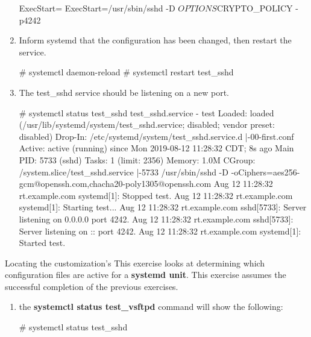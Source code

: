 \begin{Lab}
\begin{exe}
\begin{enumerate}
\begin{raw}
[Service]
ExecStart=
ExecStart=/usr/sbin/sshd -D $OPTIONS $CRYPTO_POLICY -p4242
		\end{raw}

		\item 
		Inform systemd that the configuration has been changed, then restart the service.
		\begin{raw}
# systemctl daemon-reload 
# systemctl restart test_sshd 
		\end{raw} 

		\item 
		The test\_sshd service should be listening on a new port. 
		\begin{rawfootnotesize} 
# systemctl status   test_sshd
 test_sshd.service - test
   Loaded: loaded (/usr/lib/systemd/system/test_sshd.service; disabled; vendor preset: disabled)
  Drop-In: /etc/systemd/system/test_sshd.service.d
           |-00-first.conf
   Active: active (running) since Mon 2019-08-12 11:28:32 CDT; 8s ago
 Main PID: 5733 (sshd)
    Tasks: 1 (limit: 2356)
   Memory: 1.0M
   CGroup: /system.slice/test_sshd.service
           |-5733 /usr/sbin/sshd -D -oCiphers=aes256-gcm@openssh.com,chacha20-poly1305@openssh.com
Aug 12 11:28:32 rt.example.com systemd[1]: Stopped test.
Aug 12 11:28:32 rt.example.com systemd[1]: Starting test...
Aug 12 11:28:32 rt.example.com sshd[5733]: Server listening on 0.0.0.0 port 4242.
Aug 12 11:28:32 rt.example.com sshd[5733]: Server listening on :: port 4242.
Aug 12 11:28:32 rt.example.com systemd[1]: Started test.
		\end{rawfootnotesize}



		\end{enumerate}
		\end{exe}


\begin{exe}{Locating the customization's}
	This exercise looks at determining which configuration 
	files are active for a \textbf{systemd unit}. This exercise assumes 
	the successful completion of the previous exercises. 

	\begin{enumerate}
		\item the \textbf{systemctl status test\_vsftpd} command will 
		show the following: 
	\begin{raw}
# systemctl status test_sshd
	\end{raw}


\end{enumerate}
\end{exe}
\end{Lab}
